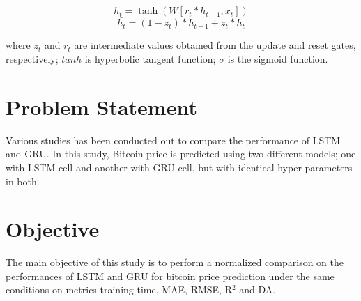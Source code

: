 \begin{equation}
	\bar{h_t} =  \tanh(W[r_t*h_{t-1}, x_t])
\end{equation}
\begin{equation}
	\bar{h_t} =  (1-z_t) * h_{t-1} + z_t * h_t
\end{equation}
	
where $z_t$ and $r_t$ are intermediate values obtained from the update and reset gates, respectively; $tanh$ is hyperbolic tangent function; $\sigma$ is the sigmoid function.

\section{Problem Statement}
Various studies has been conducted out to compare the performance of LSTM and GRU. In this study, Bitcoin price is predicted using two different models; one with LSTM cell and another with GRU cell, but with identical hyper-parameters in both.

\section{Objective}
The main objective of this study is to perform a normalized comparison on the performances of LSTM and GRU for bitcoin price prediction under the same conditions on metrics training time, MAE, RMSE, R$^2$ and DA.



